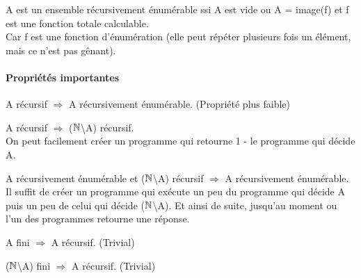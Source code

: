 \begin{myprop}
	A est un ensemble récursivement énumérable ssi A est vide ou A = image(f) et f
	est une fonction totale calculable. \\
	Car f est une fonction d'énumération (elle
	peut répéter plusieurs fois un élément, mais ce n'est pas gênant).
\end{myprop}


\paragraph{Propriétés importantes}
\label{par:propri_t_s_importantes}
\begin{myprop}
	A récursif $\Rightarrow$ A récursivement énumérable. (Propriété plus
		faible)
\end{myprop}

\begin{myprop}
	A récursif $\Rightarrow$ ($\mathbb{N}$\textbackslash A) récursif.\\ On peut facilement créer
		un programme qui retourne 1 - le programme qui décide A.
\end{myprop}

\begin{myprop}
	A récursivement énumérable et ($\mathbb{N}$\textbackslash A) récursif
		$\Rightarrow$ A récursivement énumérable.\\ Il suffit de créer un programme
		qui exécute un peu du programme qui décide A puis un peu de celui qui
		décide ($\mathbb{N}$\textbackslash A). Et ainsi de suite, jusqu'au moment ou l'un 
		des programmes retourne une réponse.
\end{myprop}

\begin{myprop}
	A fini $\Rightarrow$ A récursif. (Trivial)
\end{myprop}

\begin{myprop}
	($\mathbb{N}$\textbackslash A) fini $\Rightarrow$ A récursif. (Trivial)
\end{myprop}



